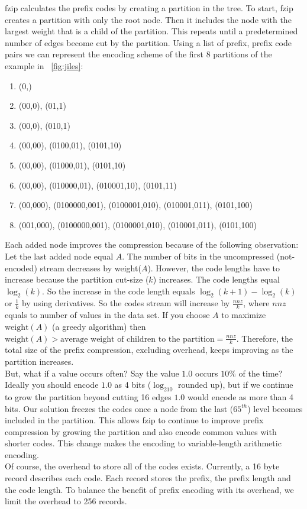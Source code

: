 fzip calculates the prefix codes by creating a partition in the tree. To start, fzip creates a partition with only the root node. Then it includes the node with the largest weight that is a child of the partition. This repeats until a predetermined number of edges become cut by the partition. Using a list of prefix, prefix code pairs we can represent the encoding scheme of the first 8 partitions of the example in \figurename~\ref{fig:jiles}:\par
\begin{enumerate}
    \item (0,)
    \item (00,0), (01,1)
    \item (00,0), (010,1)
    \item (00,00), (0100,01), (0101,10)
    \item (00,00), (01000,01), (0101,10)
    \item (00,00), (010000,01), (010001,10), (0101,11)
    \item (00,000), (0100000,001), (0100001,010), (010001,011), (0101,100)
    \item (001,000), (0100000,001), (0100001,010), (010001,011), (0101,100)
\end{enumerate} \par
Each added node improves the compression because of the following observation: Let the last added node equal $A$. The number of bits in the uncompressed (not-encoded) stream decreases by weight($A$). However, the code lengths have to increase because the partition cut-size ($k$) increases. The code lengths equal $\log_2(k)$. So the increase in the code length equals $\log_2(k+1)-\log_2(k)$ or $\frac{1}{k}$ by using derivatives. So the codes stream will increase by $\frac{nnz}{k}$, where $nnz$ equals to number of values in the data set. If you choose $A$ to maximize $\textrm{weight}(A)$ (a greedy algorithm) then $\textrm{weight}(A) > \textrm{average weight of children to the partition} = \frac{nnz}{k}$. Therefore, the total size of the prefix compression, excluding overhead, keeps improving as the partition increases.\\
\indent But, what if a value occurs often? Say the value $1.0$ occurs $10\%$ of the time? Ideally you should encode $1.0$ as 4 bits ($\log_210$ rounded up), but if we continue to grow the partition beyond cutting 16 edges $1.0$ would encode as more than 4 bits. Our solution freezes the codes once a node from the last ($65^{th}$) level becomes included in the partition. This allows fzip to continue to improve prefix compression by growing the partition and also encode common values with shorter codes. This change makes the encoding to variable-length arithmetic encoding.\\
\indent Of course, the overhead to store all of the codes exists. Currently, a 16 byte record describes each code. Each record stores the prefix, the prefix length and the code length. To balance the benefit of prefix encoding with its overhead, we limit the overhead to 256 records.
